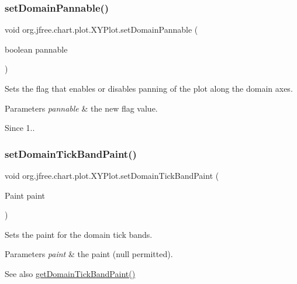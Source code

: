 \subsubsection{\texorpdfstring{set\+Domain\+Pannable()}{setDomainPannable()}}
{\footnotesize\ttfamily void org.\+jfree.\+chart.\+plot.\+X\+Y\+Plot.\+set\+Domain\+Pannable (\begin{DoxyParamCaption}\item[{boolean}]{pannable }\end{DoxyParamCaption})}

Sets the flag that enables or disables panning of the plot along the domain axes.


\begin{DoxyParams}{Parameters}
{\em pannable} & the new flag value.\\
\hline
\end{DoxyParams}
\begin{DoxySince}{Since}
1.. 
\end{DoxySince}
\mbox{\label{classorg_1_1jfree_1_1chart_1_1plot_1_1_x_y_plot_ab102d5a43987a1404ce99b0689772132}} 
\subsubsection{\texorpdfstring{set\+Domain\+Tick\+Band\+Paint()}{setDomainTickBandPaint()}}
{\footnotesize\ttfamily void org.\+jfree.\+chart.\+plot.\+X\+Y\+Plot.\+set\+Domain\+Tick\+Band\+Paint (\begin{DoxyParamCaption}\item[{Paint}]{paint }\end{DoxyParamCaption})}

Sets the paint for the domain tick bands.


\begin{DoxyParams}{Parameters}
{\em paint} & the paint ({\ttfamily null} permitted).\\
\hline
\end{DoxyParams}
\begin{DoxySeeAlso}{See also}
\mbox{\hyperlink{classorg_1_1jfree_1_1chart_1_1plot_1_1_x_y_plot_aab6b385287de8c012990c2dd3e2ff126}{get\+Domain\+Tick\+Band\+Paint()}} 
\end{DoxySeeAlso}
\mbox{\label{classorg_1_1jfree_1_1chart_1_1plot_1_1_x_y_plot_a9edcbc7a87e2dcd4a7972a5218bd4ea3}} 
